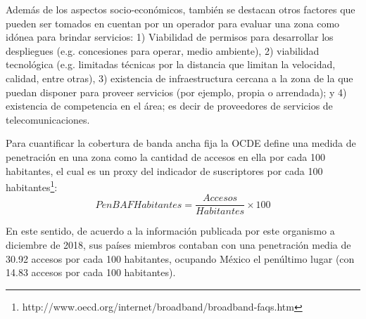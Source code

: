 \documentclass[9pt,twocolumn,twoside]{ilcss}
\begin{document}
Además de los aspectos socio-económicos, también se destacan otros factores que pueden ser tomados en cuentan por un operador para evaluar una zona como idónea para brindar servicios: 1) Viabilidad de permisos para desarrollar los despliegues (e.g. concesiones para operar, medio ambiente), 2) viabilidad tecnológica (e.g. limitadas técnicas por la distancia que limitan la velocidad, calidad, entre otras), 3) existencia de infraestructura cercana a la zona de la que puedan disponer para proveer servicios (por ejemplo, propia o arrendada); y 4) existencia de competencia en el área; es decir de proveedores de servicios de telecomunicaciones.
%	
%
%

Para cuantificar la cobertura de banda ancha fija la OCDE define una medida de penetración en una zona como la cantidad de accesos en ella por cada 100 habitantes, el cual es un proxy del indicador de suscriptores por cada 100 habitantes\footnote{http://www.oecd.org/internet/broadband/broadband-faqs.htm}:
\begin{equation}\label{pen_habitantes}
PenBAFHabitantes = \frac{Accesos }{Habitantes} \times 100 
\end{equation}

En este sentido, de acuerdo a la información publicada por este organismo a diciembre de 2018, sus países miembros contaban con una penetración media de 30.92 accesos por cada 100 habitantes, ocupando México el penúltimo lugar (con 14.83 accesos por cada 100 habitantes).
\end{document}
